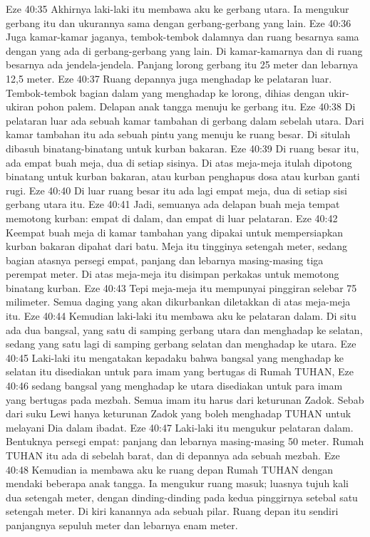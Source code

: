 Eze 40:35  Akhirnya laki-laki itu membawa aku ke gerbang utara. Ia mengukur gerbang itu dan ukurannya sama dengan gerbang-gerbang yang lain.
Eze 40:36  Juga kamar-kamar jaganya, tembok-tembok dalamnya dan ruang besarnya sama dengan yang ada di gerbang-gerbang yang lain. Di kamar-kamarnya dan di ruang besarnya ada jendela-jendela. Panjang lorong gerbang itu 25 meter dan lebarnya 12,5 meter.
Eze 40:37  Ruang depannya juga menghadap ke pelataran luar. Tembok-tembok bagian dalam yang menghadap ke lorong, dihias dengan ukir-ukiran pohon palem. Delapan anak tangga menuju ke gerbang itu.
Eze 40:38  Di pelataran luar ada sebuah kamar tambahan di gerbang dalam sebelah utara. Dari kamar tambahan itu ada sebuah pintu yang menuju ke ruang besar. Di situlah dibasuh binatang-binatang untuk kurban bakaran.
Eze 40:39  Di ruang besar itu, ada empat buah meja, dua di setiap sisinya. Di atas meja-meja itulah dipotong binatang untuk kurban bakaran, atau kurban penghapus dosa atau kurban ganti rugi.
Eze 40:40  Di luar ruang besar itu ada lagi empat meja, dua di setiap sisi gerbang utara itu.
Eze 40:41  Jadi, semuanya ada delapan buah meja tempat memotong kurban: empat di dalam, dan empat di luar pelataran.
Eze 40:42  Keempat buah meja di kamar tambahan yang dipakai untuk mempersiapkan kurban bakaran dipahat dari batu. Meja itu tingginya setengah meter, sedang bagian atasnya persegi empat, panjang dan lebarnya masing-masing tiga perempat meter. Di atas meja-meja itu disimpan perkakas untuk memotong binatang kurban.
Eze 40:43  Tepi meja-meja itu mempunyai pinggiran selebar 75 milimeter. Semua daging yang akan dikurbankan diletakkan di atas meja-meja itu.
Eze 40:44  Kemudian laki-laki itu membawa aku ke pelataran dalam. Di situ ada dua bangsal, yang satu di samping gerbang utara dan menghadap ke selatan, sedang yang satu lagi di samping gerbang selatan dan menghadap ke utara.
Eze 40:45  Laki-laki itu mengatakan kepadaku bahwa bangsal yang menghadap ke selatan itu disediakan untuk para imam yang bertugas di Rumah TUHAN,
Eze 40:46  sedang bangsal yang menghadap ke utara disediakan untuk para imam yang bertugas pada mezbah. Semua imam itu harus dari keturunan Zadok. Sebab dari suku Lewi hanya keturunan Zadok yang boleh menghadap TUHAN untuk melayani Dia dalam ibadat.
Eze 40:47  Laki-laki itu mengukur pelataran dalam. Bentuknya persegi empat: panjang dan lebarnya masing-masing 50 meter. Rumah TUHAN itu ada di sebelah barat, dan di depannya ada sebuah mezbah.
Eze 40:48  Kemudian ia membawa aku ke ruang depan Rumah TUHAN dengan mendaki beberapa anak tangga. Ia mengukur ruang masuk; luasnya tujuh kali dua setengah meter, dengan dinding-dinding pada kedua pinggirnya setebal satu setengah meter. Di kiri kanannya ada sebuah pilar. Ruang depan itu sendiri panjangnya sepuluh meter dan lebarnya enam meter.
